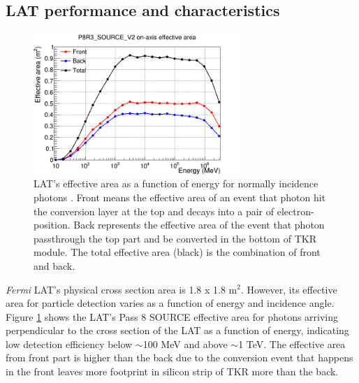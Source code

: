 \subsection{LAT performance and characteristics}

\begin{figure}[h!]
    \centering
    \includegraphics[width=0.7\textwidth]{content/background/figures/eff_energy.png}
    \caption{
        LAT's effective area as a function of energy
        for normally incidence photons \citep{lat_p8_performance}.
        Front means the effective area of an event that photon hit
        the conversion layer at the top and decays into
        a pair of electron-position.
        Back represents the effective area of the event that photon
        passthrough the top part and be converted in the bottom of 
        TKR module. The total effective area (black)
        is the combination of front and back.
    }
    \label{fig:eff_energy}
\end{figure}

\textit{Fermi} LAT's physical cross section area is 1.8 x 1.8 m$^2$.
However, its effective area for particle detection varies as a
function of energy and incidence angle. Figure \ref{fig:eff_energy}
shows the LAT's Pass 8 SOURCE effective
area for photons arriving
perpendicular to the cross section of the LAT as a function
of energy, indicating low detection efficiency below $\sim$100 MeV
and above $\sim$1 TeV.
The effective area from front part is higher than the back due to 
the conversion event that happens in the front 
leaves more footprint in silicon strip of TKR more than the back.



